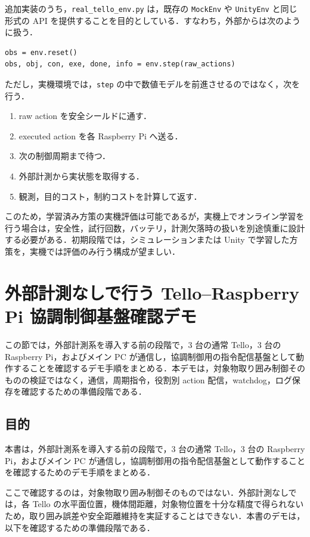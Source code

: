 追加実装のうち，\texttt{real\_tello\_env.py} は，既存の \texttt{MockEnv} や \texttt{UnityEnv} と同じ形式の API を提供することを目的としている．すなわち，外部からは次のように扱う．

\begin{lstlisting}
obs = env.reset()
obs, obj, con, exe, done, info = env.step(raw_actions)
\end{lstlisting}

ただし，実機環境では，\texttt{step} の中で数値モデルを前進させるのではなく，次を行う．

\begin{enumerate}[label=\arabic*.]
  \item raw action を安全シールドに通す．
  \item executed action を各 Raspberry Pi へ送る．
  \item 次の制御周期まで待つ．
  \item 外部計測から実状態を取得する．
  \item 観測，目的コスト，制約コストを計算して返す．
\end{enumerate}

このため，学習済み方策の実機評価は可能であるが，実機上でオンライン学習を行う場合は，安全性，試行回数，バッテリ，計測欠落時の扱いを別途慎重に設計する必要がある．初期段階では，シミュレーションまたは Unity で学習した方策を，実機では評価のみ行う構成が望ましい．

\section{外部計測なしで行う Tello--Raspberry Pi 協調制御基盤確認デモ}
\label{sec:no_tracker_demo}

この節では，外部計測系を導入する前の段階で，3 台の通常 Tello，3 台の Raspberry Pi，およびメイン PC が通信し，協調制御用の指令配信基盤として動作することを確認するデモ手順をまとめる．本デモは，対象物取り囲み制御そのものの検証ではなく，通信，周期指令，役割別 action 配信，watchdog，ログ保存を確認するための準備段階である．

\subsection{目的}

本書は，外部計測系を導入する前の段階で，3 台の通常 Tello，3 台の Raspberry Pi，およびメイン PC が通信し，協調制御用の指令配信基盤として動作することを確認するためのデモ手順をまとめる．

ここで確認するのは，対象物取り囲み制御そのものではない．外部計測なしでは，各 Tello の水平面位置，機体間距離，対象物位置を十分な精度で得られないため，取り囲み誤差や安全距離維持を実証することはできない．本書のデモは，以下を確認するための準備段階である．

